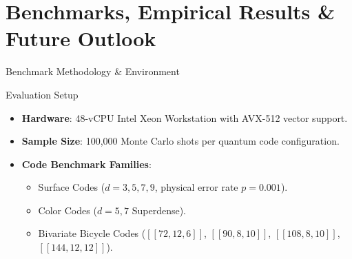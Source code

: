 \section{Benchmarks, Empirical Results \& Future Outlook}

\begin{frame}{Benchmark Methodology \& Environment}
    \begin{block}{Evaluation Setup}
        \begin{itemize}
            \item \textbf{Hardware}: 48-vCPU Intel Xeon Workstation with AVX-512 vector support.
            \item \textbf{Sample Size}: 100,000 Monte Carlo shots per quantum code configuration.
            \item \textbf{Code Benchmark Families}:
                  \begin{itemize}
                      \item Surface Codes ($d=3, 5, 7, 9$, physical error rate $p=0.001$).
                      \item Color Codes ($d=5, 7$ Superdense).
                      \item Bivariate Bicycle Codes ($[[72,12,6]]$, $[[90,8,10]]$, $[[108,8,10]]$, $[[144,12,12]]$).
                  \end{itemize}
        \end{itemize}
    \end{block}
\end{frame}

